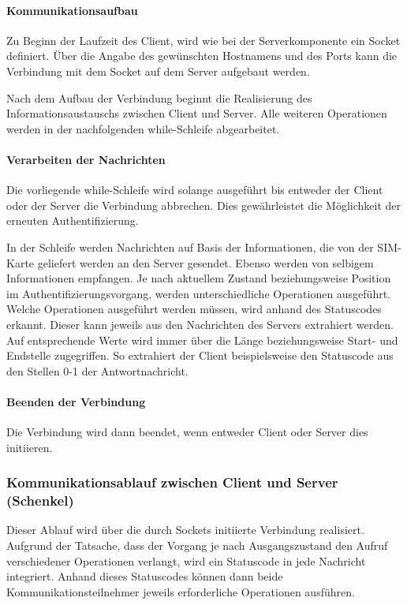         \paragraph{Kommunikationsaufbau} Zu Beginn der Laufzeit des Client, wird wie bei der 
        Serverkomponente ein Socket definiert. Über die Angabe des gewünschten Hostnamens und des Ports
        kann die Verbindung mit dem Socket auf dem Server aufgebaut werden.

        Nach dem Aufbau der Verbindung beginnt die Realisierung des Informationsaustauschs zwischen
        Client und Server.
        Alle weiteren Operationen werden in der nachfolgenden while-Schleife abgearbeitet.

        \paragraph{Verarbeiten der Nachrichten} Die vorliegende while-Schleife wird solange ausgeführt
        bis entweder der Client oder der Server die Verbindung abbrechen. Dies gewährleistet die
        Möglichkeit der erneuten Authentifizierung.

        In der Schleife werden Nachrichten auf Basis der Informationen, die von der SIM-Karte geliefert werden
        an den Server gesendet. Ebenso werden von selbigem Informationen empfangen. Je nach aktuellem Zustand
        beziehungsweise Position im Authentifizierungsvorgang, werden unterschiedliche Operationen ausgeführt.
        Welche Operationen ausgeführt werden müssen, wird anhand des Statuscodes erkannt. Dieser kann
        jeweils aus den Nachrichten des Servers extrahiert werden. Auf entsprechende Werte wird immer
        über die Länge beziehungsweise Start- und Endstelle zugegriffen. So extrahiert der Client beispielsweise
        den Statuscode aus den Stellen 0-1 der Antwortnachricht.

        \paragraph{Beenden der Verbindung} Die Verbindung wird dann beendet, wenn entweder Client
        oder Server dies initiieren. 
	
    \subsubsection{Kommunikationsablauf zwischen Client und Server (Schenkel)}
    Dieser Ablauf wird über die durch Sockets initiierte Verbindung realisiert. Aufgrund
    der Tatsache, dass der Vorgang je nach Ausgangszustand den Aufruf verschiedener Operationen
    verlangt, wird ein Statuscode in jede Nachricht integriert. Anhand dieses Statuscodes
    können dann beide Kommunikationsteilnehmer jeweils erforderliche Operationen ausführen.

